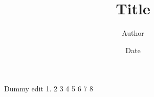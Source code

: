 \documentclass[12pt]{article}
\title{Title}
\author{Author}
\date{Date}
\begin{document}
\maketitle

Dummy edit 1. 2 3 4 5 6 7 8









\end{document}
